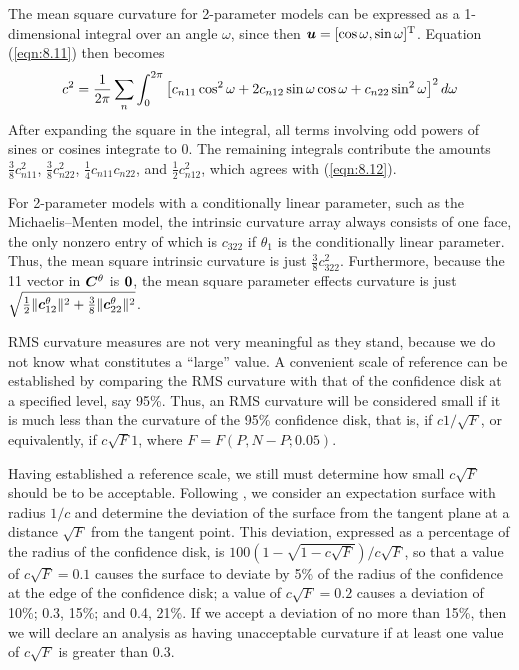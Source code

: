 The mean square curvature for 2-parameter models can be
expressed as a 1-dimensional integral over an angle $\omega$,
since then $\bu = [ \cos\omega ,\sin\omega ] \trans$.
Equation (\ref{eqn:8.11}) then becomes
$$
c^2 = { 1   \over  2 \pi }
\sum_n { \int_0^{{2} \pi} {
\left[ c_{n11} \cos^2 \omega +
2 c_{n12} \sin  \omega  \cos  \omega +
c_{n22} \sin^2 \omega\right]^2 d \omega } }
$$
After expanding the square in the integral, all terms involving
odd powers of sines or cosines integrate to 0.
The remaining integrals contribute the amounts
$\frac{3}{8}c_{n11}^2 $, $\frac{3}{8}c_{n22}^2 $,
$\frac{1}{4}c_{n11} c_{n22}$, and $\frac{1}{2}c_{n12}^{2}$,
which agrees with (\ref{eqn:8.12}).

\begin{example}\label{mic:rms}

For 2-parameter models with a conditionally linear parameter,
such as the Michaelis--Menten model, the intrinsic curvature array
always consists of one face, the only nonzero entry of which is
$c_{322}$ if $\theta_{1}$ is the conditionally linear parameter.
Thus, the mean square intrinsic curvature is just
$\frac{3}{8}c_{322}^2 $.
Furthermore, because the 11 vector in ${\boldsymbol C}^{\theta}$ is $ {\bf 0} $, the
mean square parameter effects curvature is just
$\sqrt { \frac{1}{2} \| {\boldsymbol c}_{12}^{\theta} \|^2 +
\frac{3}{8} \| {\boldsymbol c}_{22}^{\theta} \|^2}$.
\end{example}

RMS curvature measures are not very meaningful as they
stand, because we do not know what constitutes a ``large''
value.
A convenient scale of reference can be established by comparing
the RMS curvature with that of the confidence disk
at a specified level, say 95\%.
Thus, an RMS curvature will be considered small if it is
much less than the curvature of the 95\% confidence disk,
that is, if
$c1 / \sqrt F$,
or equivalently, if $c \sqrt F  1$, where $F=F(P,N-P; 0.05 )$.

Having established a reference scale, we still must
determine how small $c \sqrt F$ should be to be acceptable.
Following , we consider an expectation
surface with radius $1/c$ and determine the
deviation of the surface from the tangent plane at a
distance $\sqrt F$ from the tangent point.
This deviation, expressed as a percentage of the radius of
the confidence disk, is
$100 ( 1 - \sqrt { 1 - c \sqrt F } ) / c \sqrt F$,
so that a value of $c \sqrt F =  0.1$ causes the surface to
deviate by 5\% of the radius of the confidence at the edge of
the confidence disk;
a value of $c \sqrt F =  0.2$ causes a deviation of
10\%; 0.3, 15\%; and 0.4, 21\%.
If we accept a deviation of no more than 15\%, then we will
declare an analysis as having unacceptable curvature if at least
one value of $c \sqrt F$ is greater than $0.3$.

